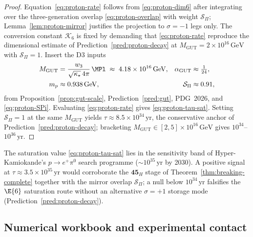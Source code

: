 \begin{proof}
Equation~\eqref{eq:proton-rate} follows from \eqref{eq:proton-dim6} after
integrating over the three-generation overlap \eqref{eq:proton-overlap} with
weight $\mathcal{S}_\Pi$; Lemma~\ref{lem:proton-mirror} justifies the
projection to $\sigma=-1$ legs only. The conversion constant $\mathcal{K}_{6}$
is fixed by demanding that \eqref{eq:proton-rate} reproduce the dimensional
estimate of Prediction~\ref{pred:proton-decay} at
$M_{\mathrm{GUT}}=2\times 10^{16}\,\mathrm{GeV}$ with $\mathcal{S}_\Pi=1$.
Insert the D3 inputs
\begin{align*}
  M_{\mathrm{GUT}}
  &= \frac{w_3}{\sqrt{\kappa_\star}\,4\pi}\,\MPl
   \;\approx\; 4.18\times 10^{16}\,\mathrm{GeV},
  &
  \alpha_{\mathrm{GUT}} &\approx \tfrac{1}{24},
  \\
  m_p &\approx 0.938\,\mathrm{GeV},
  &
  \mathcal{S}_\Pi &\approx 0.91,
\end{align*}
from Proposition~\ref{prop:gut-scale}, Prediction~\ref{pred:gut}, PDG~2026, and
\eqref{eq:proton-SPi}. Evaluating \eqref{eq:proton-rate} gives
\eqref{eq:proton-tau-sat}. Setting $\mathcal{S}_\Pi=1$ at the same
$M_{\mathrm{GUT}}$ yields $\tau\approx 8.5\times 10^{34}\,\mathrm{yr}$, the
conservative anchor of Prediction~\ref{pred:proton-decay}; bracketing
$M_{\mathrm{GUT}}\in[2,5]\times 10^{16}\,\mathrm{GeV}$ gives
$10^{34}$--$10^{36}\,\mathrm{yr}$.
\end{proof}

\begin{corollary}\label{cor:proton-hyperk}
The saturation value \eqref{eq:proton-tau-sat} lies in the sensitivity band
of Hyper-Kamiokande's $p\to e^+\pi^0$ search programme ($\sim 10^{35}\,\mathrm{yr}$
by 2030). A positive signal at $\tau\approx 3.5\times 10^{35}\,\mathrm{yr}$
would corroborate the $\mathbf{45}_H$ stage of Theorem~\ref{thm:breaking-complete}
together with the mirror overlap $\mathcal{S}_\Pi$; a null below
$10^{34}\,\mathrm{yr}$ falsifies the $\E{6}$ saturation route without an
alternative $\sigma=+1$ storage mode (Prediction~\ref{pred:proton-decay}).
\end{corollary}

\subsection{Numerical workbook and experimental contact}
\label{sec:proton-decay:numerical}

